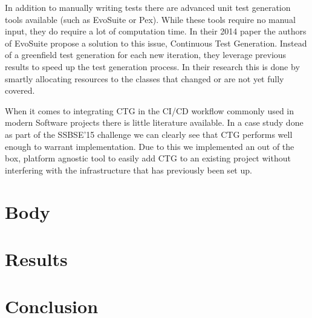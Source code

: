 \documentclass[12pt, a4paper]{article}
\begin{document}
In addition to manually writing tests there are advanced unit test generation tools available (such as EvoSuite or Pex). While these tools require no manual input, they do require a lot of computation time. In their 2014 paper \cite{campos_continuous_2014} the authors of EvoSuite propose a solution to this issue, Continuous Test Generation. Instead of a greenfield test generation for each new iteration, they leverage previous results to speed up the test generation process. In their research this is done by smartly allocating resources to the classes that changed or are not yet fully covered.

When it comes to integrating CTG in the CI/CD workflow commonly used in modern Software projects there is little literature available. In a case study done as part of the SSBSE'15 challenge \cite{barros_continuous_2015} we can clearly see that CTG performs well enough to warrant implementation. Due to this we implemented an out of the box, platform agnostic tool to easily add CTG to an existing project without interfering with the infrastructure that has previously been set up.

\section{Body}


\section{Results}


\section{Conclusion}



\newpage
{} %
\printbibliography %



\end{document}
